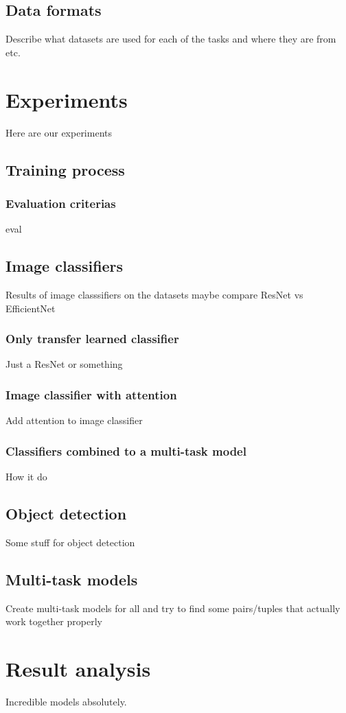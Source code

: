 \section{Data formats}
Describe what datasets are used for each of the tasks and where they are from etc.

\chapter{Experiments}
Here are our experiments
\section{Training process}
\subsection{Evaluation criterias}
eval
\section{Image classifiers}
Results of image classsifiers on the datasets maybe compare ResNet vs EfficientNet
\subsection{Only transfer learned classifier}
Just a ResNet or something
\subsection{Image classifier with attention}
Add attention to image classifier
\subsection{Classifiers combined to a multi-task model}
How it do
\section{Object detection}
Some stuff for object detection
\section{Multi-task models}
Create multi-task models for all and try to find some pairs/tuples that actually work together properly
\chapter{Result analysis}
Incredible models absolutely.

